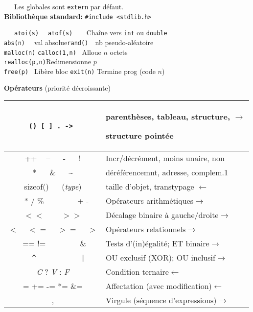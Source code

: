 \documentclass[a4paper,10pt,landscape]{article}
\newcommand{\Subsection}[1]{{\textbf{#1}}}
\begin{document}
\begin{minipage}{1.0\linewidth}
\begin{multicols}{3}
  ~~~Les globales sont \verb=extern= par défaut.\\[-.5\baselineskip]

  \textbf{Bibliothèque standard:} \verb=#include <stdlib.h>= \vspace{-.6\baselineskip}
  \begin{tabbing}
    ~~~\=\verb=atoi(s)  = \=\verb=atof(s)    =\=Chaîne vers \verb=int= ou \verb=double=\\
    \>\verb=abs(n)  = val absolue\>\>\verb=rand()  =nb pseudo-aléatoire\\
    \>\verb=malloc(n)= \>\verb=calloc(1,n)= \>~Alloue $n$ octets\\
    \>\verb=realloc(p,n)=\>\>Redimensionne $p$\\
    \>\verb=free(p) = Libère bloc 
    \>\>\verb=exit(n)= Termine prog (code $n$)
  \end{tabbing}
  \columnbreak %

  \Subsection{Opérateurs} (priorité décroissante)
  
  \begin{tabular}{|c|c| p{53.5mm}|}\hline
    \multicolumn{2}{|c|}{\tt ()  [ ]  .  -> }
    & parenthèses, tableau, structure, \hfill$\rightarrow$\par
      structure pointée\\\hline
    \multicolumn{2}{|c|}{++ ~ -- ~~  - ~~ !}&Incr/décrément, moins unaire, non\\
    \multicolumn{2}{|c|}{* ~~ \& ~~ \~}&déréférencemnt, adresse,
                                         complem.1$\!\!$\\
    \multicolumn{2}{|c|}{sizeof() ~~  (\textit{type})}&
     taille d'objet, transtypage \hfill$\leftarrow$\\\hline
    * / \% & + - & Opérateurs arithmétiques\hfill$\rightarrow$ \\\hline
    \multicolumn{2}{|c|}{$<<$ ~~~ $>>$} &Décalage binaire à gauche/droite\hfill$\rightarrow$\\\hline
    \multicolumn{2}{|c|}{$<$ ~ $<=$ ~ $>=$ ~ $>$} &Opérateurs relationnels\hfill$\rightarrow$\\\hline
    ==  != &  \& & Tests d'(in)égalité; ET binaire\hfill$\rightarrow$\\\hline
    \verb=^= & \verb=|= & OU exclusif (XOR); OU inclusif\hfill$\rightarrow$\\\hline
    \multicolumn{2}{|c|}{\textit{C} ? \textit{V} : \textit{F}}&
        Condition ternaire\hfill$\leftarrow$\\\hline
    \multicolumn{2}{|c|}{=  += -= *= \&= }&
        Affectation (avec modification)\hfill$\leftarrow$\\\hline
    \multicolumn{2}{|c|}{,}& Virgule (séquence d'expressions)\hfill$\rightarrow$\\\hline
  \end{tabular}


\end{multicols}
\end{minipage}
\end{document}
